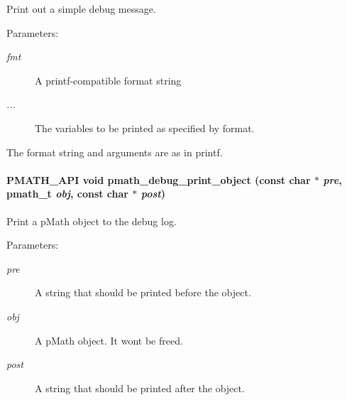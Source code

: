 Print out a simple debug message. 

\begin{Desc}
\item[Parameters:]
\begin{description}
\item[{\em fmt}]A printf-compatible format string \item[{\em ...}]The variables to be printed as specified by format.\end{description}
\end{Desc}
The format string and arguments are as in printf. \hypertarget{group__debug_g05424b6252f7de0e25b31aa10328c64a}{
\paragraph[{pmath\_\-debug\_\-print\_\-object}]{\setlength{\rightskip}{0pt plus 5cm}PMATH\_\-API void pmath\_\-debug\_\-print\_\-object (const char $\ast$ {\em pre}, \/  {\bf pmath\_\-t} {\em obj}, \/  const char $\ast$ {\em post})}\hfill}
\label{group__debug_g05424b6252f7de0e25b31aa10328c64a}


Print a pMath object to the debug log. 

\begin{Desc}
\item[Parameters:]
\begin{description}
\item[{\em pre}]A string that should be printed before the object. \item[{\em obj}]A pMath object. It wont be freed. \item[{\em post}]A string that should be printed after the object. \end{description}
\end{Desc}
